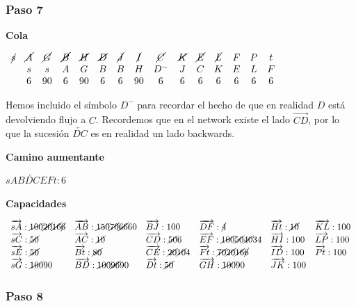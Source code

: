 \documentclass[10pt,a4paper]{article}
\begin{document}
\subsubsection*{Paso 7}

\textbf{Cola}

$\begin{array}{ccccccccccccccc} \cancel{s} & \cancel{A} & \cancel{G} &\cancel{B} & \cancel{H} & \cancel{D} & \cancel{J} & \cancel{I} & \cancel{C} & \cancel{K} & \cancel{E} & \cancel{L}& F & P & t\\ & s & s & A & G & B &B & H & D^{-} & J & C & K & E & L & F\\ & 6 & 90 & 6 & 90 &6 & 6 & 90 & 6 &6 & 6 & 6 & 6 & 6 & 6 \end{array}$

Hemos incluido el símbolo $D^-$ para recordar el hecho de que en realidad $D$ está devolviendo flujo a $C$. Recordemos que en el network existe el lado $\overrightarrow{CD}$, por lo que la sucesión $\overleftarrow{DC}$ es en realidad un lado backwards.

\textbf{Camino aumentante}

\textbf{$sAB\overleftarrow{DC}EFt:6$}

\textbf{Capacidades}

$\begin{array}{llllll} \overrightarrow{sA}: \cancel{100}\cancel{20}\cancel{16}\cancel{6}& \overrightarrow{AB}: \cancel{150} \cancel{70}\cancel{66}60&\overrightarrow{BJ}: 100&\overrightarrow{DF}: \cancel{4}&\overrightarrow{Ht}: \cancel{10}&\overrightarrow{KL}: 100\\ \overrightarrow{sC}: \cancel{50}& \overrightarrow{AC}: \cancel{10}&\overrightarrow{CD}: \cancel{50}6&\overrightarrow{EF}: \cancel{100}\cancel{50}\cancel{40}34&\overrightarrow{HI}: 100&\overrightarrow{LP}: 100\\ \overrightarrow{sE}: \cancel{50}& \overrightarrow{Bt}: \cancel{80}&\overrightarrow{CE}: \cancel{20}\cancel{10}4 &\overrightarrow{Ft}: \cancel{70}\cancel{20}\cancel{16}\cancel{6}&\overrightarrow{ID}: 100&\overrightarrow{Pt}: 100\\ \overrightarrow{sG}: \cancel{100}90& \overrightarrow{BD}: \cancel{100}\cancel{96}90&\overrightarrow{Dt}: \cancel{50}&\overrightarrow{GH}: \cancel{100}90&\overrightarrow{JK}: 100&\\ \end{array}$

\subsubsection*{Paso 8}
\end{document}
